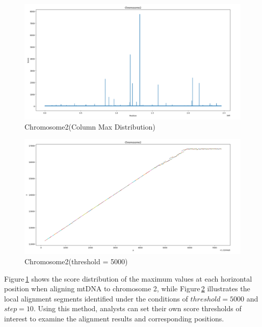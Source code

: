 \documentclass[PhD]{PHlab-thesis}
\begin{document}
\begin{figure}[htbp]
    \centering
    \includegraphics[width=1\linewidth]{figures/chromosome2Distribution.png}
    \caption{Chromosome2(Column Max Distribution)}
    \label{fig:chromosome2Distribution}
\end{figure}

\begin{figure}[htbp]
    \centering
    \includegraphics[width=1\linewidth]{figures/chromosome2threshold5000.png}
    \caption{Chromosome2(threshold = 5000)}
    \label{fig:chromosome2threshold5000}
\end{figure}

Figure \ref{fig:chromosome2Distribution} shows the score distribution of the maximum values at each horizontal position when aligning mtDNA to chromosome 2, while Figure \ref{fig:chromosome2threshold5000} illustrates the local alignment segments identified under the conditions of $threshold=5000$ and $step = 10$. Using this method, analysts can set their own score thresholds of interest to examine the alignment results and corresponding positions.
\end{document}

